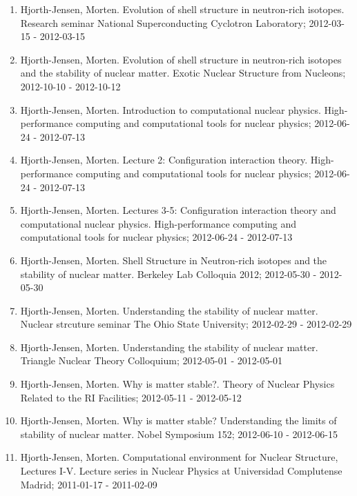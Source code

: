 \documentclass[a4wide,10pt]{article}
\begin{document}
\begin{enumerate}
\item Hjorth-Jensen, Morten.  Evolution of shell structure in neutron-rich isotopes. Research seminar National Superconducting Cyclotron Laboratory; 2012-03-15 - 2012-03-15

\item Hjorth-Jensen, Morten.  Evolution of shell structure in neutron-rich isotopes and the stability of nuclear matter. Exotic Nuclear Structure from Nucleons; 2012-10-10 - 2012-10-12

\item Hjorth-Jensen, Morten.  Introduction to computational nuclear physics. High-performance computing and computational tools for nuclear physics; 2012-06-24 - 2012-07-13

\item Hjorth-Jensen, Morten.  Lecture 2: Configuration interaction theory. High-performance computing and computational tools for nuclear physics; 2012-06-24 - 2012-07-13

\item Hjorth-Jensen, Morten.  Lectures 3-5: Configuration interaction theory and computational nuclear physics. High-performance computing and computational tools for nuclear physics; 2012-06-24 - 2012-07-13

\item Hjorth-Jensen, Morten.  Shell Structure in Neutron-rich isotopes and the stability of nuclear matter. Berkeley Lab Colloquia 2012; 2012-05-30 - 2012-05-30

\item Hjorth-Jensen, Morten.  Understanding the stability of nuclear matter. Nuclear strcuture seminar The Ohio State University; 2012-02-29 - 2012-02-29

\item Hjorth-Jensen, Morten.  Understanding the stability of nuclear matter. Triangle Nuclear Theory Colloquium; 2012-05-01 - 2012-05-01

\item Hjorth-Jensen, Morten.  Why is matter stable?. Theory of Nuclear Physics Related to the RI Facilities; 2012-05-11 - 2012-05-12

\item Hjorth-Jensen, Morten.  Why is matter stable? Understanding the limits of stability of nuclear matter. Nobel Symposium 152; 2012-06-10 - 2012-06-15

\item Hjorth-Jensen, Morten. Computational environment for Nuclear Structure, Lectures I-V. Lecture series in Nuclear Physics at Universidad Complutense Madrid; 2011-01-17 - 2011-02-09


\end{enumerate}
\end{document}
